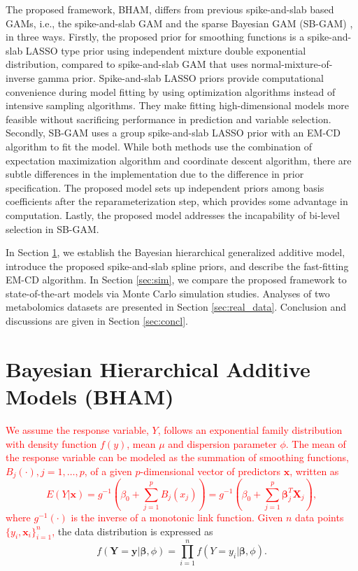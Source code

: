 \documentclass[AMA,STIX1COL,]{WileyNJD-v2}
\begin{document}
The proposed framework, BHAM, differs from previous spike-and-slab based
GAMs, i.e., the spike-and-slab GAM \citep{Scheipl2012} and the sparse
Bayesian GAM (SB-GAM) \citep{Bai2021}, in three ways. Firstly, the
proposed prior for smoothing functions is a spike-and-slab LASSO type
prior using independent mixture double exponential distribution,
compared to spike-and-slab GAM that uses normal-mixture-of-inverse gamma
prior. Spike-and-slab LASSO priors provide computational convenience
during model fitting by using optimization algorithms instead of
intensive sampling algorithms. They make fitting high-dimensional models
more feasible without sacrificing performance in prediction and variable
selection. Secondly, SB-GAM uses a group spike-and-slab LASSO prior with
an EM-CD algorithm to fit the model. While both methods use the
combination of expectation maximization algorithm and coordinate descent
algorithm, there are subtle differences in the implementation due to the
difference in prior specification. The proposed model sets up
independent priors among basis coefficients after the reparameterization
step, which provides some advantage in computation. Lastly, the proposed
model addresses the incapability of bi-level selection in SB-GAM.

In Section \ref{sec:BHAM}, we establish the Bayesian hierarchical
generalized additive model, introduce the proposed spike-and-slab spline
priors, and describe the fast-fitting EM-CD algorithm. In Section
\ref{sec:sim}, we compare the proposed framework to state-of-the-art
models via Monte Carlo simulation studies. Analyses of two metabolomics
datasets are presented in Section \ref{sec:real_data}. Conclusion and
discussions are given in Section \ref{sec:concl}.

\section{Bayesian Hierarchical Additive Models (BHAM)}
\label{sec:BHAM}

\textcolor{red}{We assume the response variable, $Y$, follows an exponential family distribution with density function $f(y)$, mean $\mu$ and dispersion parameter $\phi$. The mean of the response variable can be modeled as the summation of smoothing functions, $B_j(\cdot), j = 1, \dots, p$, of a given $p$-dimensional vector of predictors $\boldsymbol{x}$, written as 
\begin{equation}\label{eq:gam}
 E(Y|\boldsymbol{x}) = g^{-1}(\beta_0 + \sum\limits^p_{j=1}B_j(x_j)) = g^{-1}(\beta_0 + \sum\limits^p_{j=1} \boldsymbol{\beta}_j^T \boldsymbol{X}_j),
\end{equation}
where $g^{-1}(\cdot)$ is the inverse of a monotonic link function. Given $n$ data points $\{y_i, \boldsymbol{x}_i\}^n_{i=1}$,}
the data distribution is expressed as \begin{equation}
f(\boldsymbol{Y} = \boldsymbol{y}| \boldsymbol{\beta}, \phi) = \prod\limits^n_{i=1}f( Y = y_i|\boldsymbol{\beta}, \phi).\nonumber
\end{equation}
\end{document}
